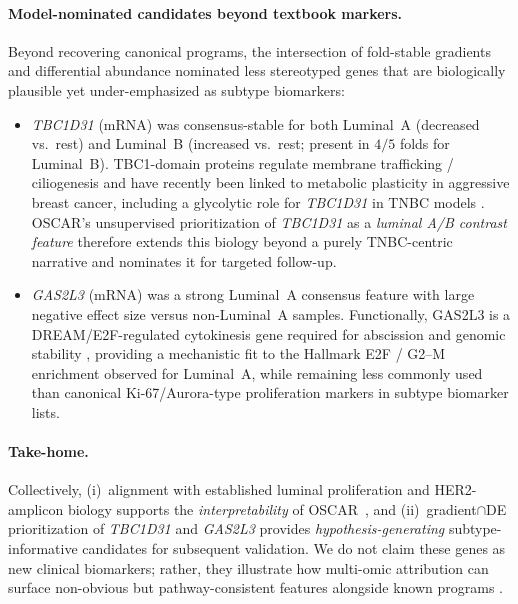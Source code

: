 \documentclass[lettersize,journal]{IEEEtran}
\begin{document}
\paragraph{Model-nominated candidates beyond textbook markers.}
Beyond recovering canonical programs, the intersection of fold-stable gradients and differential abundance nominated
less stereotyped genes that are biologically plausible yet under-emphasized as subtype biomarkers:

\begin{itemize}
    \item \textit{TBC1D31} (mRNA) was consensus-stable for both Luminal~A (decreased vs.\ rest) and Luminal~B
    (increased vs.\ rest; present in $4/5$ folds for Luminal~B).
    TBC1-domain proteins regulate membrane trafficking / ciliogenesis and have recently been linked to metabolic
    plasticity in aggressive breast cancer, including a glycolytic role for \textit{TBC1D31} in TNBC models
    \cite{Arora2024TBC1D,Senatore2021TBC1D31}.
    OSCAR's unsupervised prioritization of \textit{TBC1D31} as a \emph{luminal A/B contrast feature} therefore
    extends this biology beyond a purely TNBC-centric narrative and nominates it for targeted follow-up.

    \item \textit{GAS2L3} (mRNA) was a strong Luminal~A consensus feature with large negative effect size versus
    non-Luminal~A samples.
    Functionally, GAS2L3 is a DREAM/E2F-regulated cytokinesis gene required for abscission and genomic stability
    \cite{Wolter2012GAS2L3,Peer2013GAS2L3}, providing a mechanistic fit to the Hallmark E2F / G2--M enrichment
    observed for Luminal~A, while remaining less commonly used than canonical Ki-67/Aurora-type proliferation markers
    in subtype biomarker lists.
\end{itemize}

\paragraph{Take-home.}
Collectively, (i)~alignment with established luminal proliferation and HER2-amplicon biology supports the
\emph{interpretability} of OSCAR~\cite{Staaf2010HER2,Gao2018LuminalA,Ades2014LuminalB}, and
(ii)~gradient$\cap$DE prioritization of \textit{TBC1D31} and \textit{GAS2L3} provides
\emph{hypothesis-generating} subtype-informative candidates for subsequent validation.
We do not claim these genes as new clinical biomarkers; rather, they illustrate how multi-omic attribution can surface
non-obvious but pathway-consistent features alongside known programs
\cite{Arora2024TBC1D,Wolter2012GAS2L3,PerezPena2017MitoticLumA}.
\end{document}
